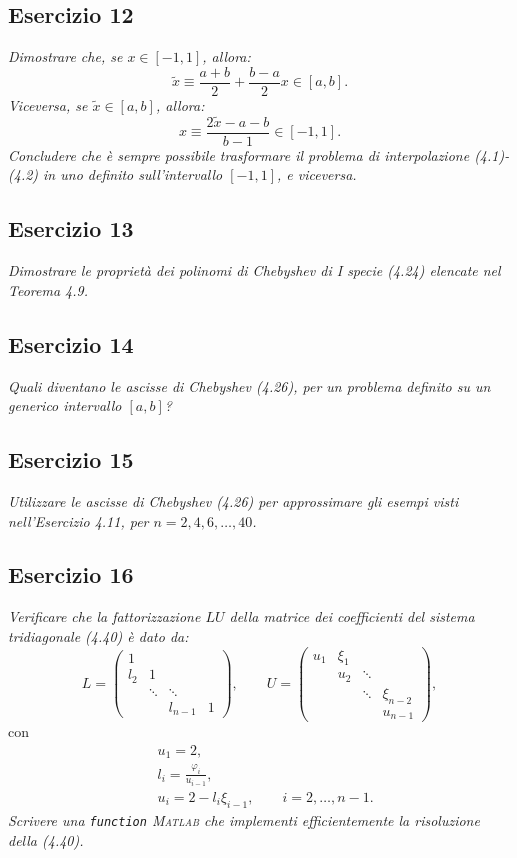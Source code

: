 \subsection{Esercizio 12}
\label{sub:Esercizio 12}
\emph{Dimostrare che, se $x\in[-1,1]$, allora:
			$$\tilde{x}\equiv\frac{a+b}{2}+\frac{b-a}{2}x\in[a,b].$$
			Viceversa, se $\tilde{x}\in[a,b]$, allora:
			$$x\equiv\frac{2\tilde{x}-a-b}{b-1}\in[-1,1].$$
			Concludere che è sempre possibile trasformare il problema di interpolazione (4.1)-(4.2) in uno definito sull'intervallo $[-1,1]$, e viceversa.
}
\subsection{Esercizio 13}
\label{sub:Esercizio 13}
\emph{Dimostrare le proprietà dei polinomi di Chebyshev di I specie (4.24) elencate nel Teorema 4.9.
}
\subsection{Esercizio 14}
\label{sub:Esercizio 14}
\emph{Quali diventano le ascisse di Chebyshev (4.26), per un problema definito su un generico intervallo $[a,b]$?}

\subsection{Esercizio 15}
\label{sub:Esercizio 15}
\emph{Utilizzare le ascisse di Chebyshev (4.26) per approssimare gli esempi visti nell'Esercizio 4.11, per $n=2,4,6,\dots,40$.}

\subsection{Esercizio 16}
\label{sub:Esercizio 16}
\emph{Verificare che la fattorizzazione $LU$ della matrice dei coefficienti del sistema tridiagonale (4.40) è dato da:}
			\[
				L=
				\begin{pmatrix}
					1 & & &\\
					l_2 & 1 & &\\
					& \ddots & \ddots &\\
					& & l_{n-1} & 1
				\end{pmatrix},
				\qquad U=
				\begin{pmatrix}
					u_1 & \xi_1 & &\\
					& u_2 & \ddots &\\
					& & \ddots & \xi_{n-2}\\
					& & & u_{n-1}
				\end{pmatrix},
			\]
			con
			\begin{align*}
				&u_1=2,\\
				&l_i=\frac{\varphi_i}{u_{i-1}},\\
				&u_i=2-l_i\xi_{i-1},\qquad i=2,\dots,n-1.
			\end{align*}
\emph{Scrivere una \lstinline{function} \textsc{Matlab} che implementi efficientemente la risoluzione della (4.40).}

